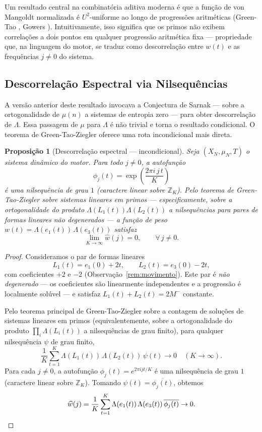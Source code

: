 \documentclass[12pt,a4paper]{article}
\newtheorem{proposition}[theorem]{Proposição}
\theoremstyle{definition}
\newcommand{\Z}{\mathbb{Z}}
\begin{document}
	Um resultado central na combinatória aditiva moderna é que a função de
	von Mangoldt normalizada é $U^2$-uniforme ao longo de progressões
	aritméticas (Green-Tao \cite{greentao}, Gowers \cite{gowers}).
	Intuitivamente, isso significa que os primos não exibem correlações a
	dois pontos em qualquer progressão aritmética fixa — propriedade que,
	na linguagem do motor, se traduz como descorrelação entre $w(t)$ e as
	frequências $j \neq 0$ do sistema.
	
	\subsection{Descorrelação Espectral via Nilsequências}
	
	A versão anterior deste resultado invocava a Conjectura de Sarnak
	\cite{sarnak} — sobre a ortogonalidade de $\mu(n)$ a sistemas de
	entropia zero — para obter descorrelação de $\Lambda$. Essa passagem
	de $\mu$ para $\Lambda$ é não trivial e torna o resultado condicional.
	O teorema de Green-Tao-Ziegler \cite{greentaoziegler} oferece uma rota
	incondicional mais direta.
	
	\begin{proposition}[Descorrelação espectral — incondicional]
		\label{prop:sarnak}
		Seja $(X_N, \mu_N, T)$ o sistema dinâmico do motor. Para todo
		$j \neq 0$, a autofunção
		\[
		\phi_j(t) = \exp\!\left(\frac{2\pi i\,j\,t}{K}\right)
		\]
		é uma nilsequência de grau $1$ (caractere linear sobre $\Z_K$).
		Pelo teorema de Green-Tao-Ziegler \cite{greentaoziegler} sobre
		sistemas lineares em primos — especificamente, sobre a
		ortogonalidade do produto $\Lambda(L_1(t))\Lambda(L_2(t))$ a
		nilsequências para pares de formas lineares não degenerados —
		a função de peso $w(t) = \Lambda(e_1(t))\,\Lambda(e_3(t))$ satisfaz
		\[
		\lim_{K\to\infty}\widehat{w}(j) = 0,\qquad \forall\, j \neq 0.
		\]
	\end{proposition}
	
	\begin{proof}
		Consideramos o par de formas lineares
		\[
		L_1(t) = e_1(0) + 2t,\qquad L_2(t) = e_3(0) - 2t,
		\]
		com coeficientes $+2$ e $-2$ (Observação~\ref{rem:movimento}).
		Este par é \emph{não degenerado} — os coeficientes são linearmente
		independentes e a progressão é localmente solúvel — e satisfaz
		$L_1(t) + L_2(t) = 2M^-$ constante.
		
		Pelo teorema principal de Green-Tao-Ziegler
		\cite{greentaoziegler} sobre a contagem de soluções de sistemas
		lineares em primos (equivalentemente, sobre a ortogonalidade do
		produto $\prod_i \Lambda(L_i(t))$ a nilsequências de grau finito),
		para qualquer nilsequência $\psi$ de grau finito,
		\[
		\frac{1}{K}\sum_{t=1}^{K} \Lambda(L_1(t))\,\Lambda(L_2(t))\,\psi(t) \to 0
		\quad (K \to \infty).
		\]
		Para cada $j \neq 0$, a autofunção $\phi_j(t) = e^{2\pi i j t/K}$ é
		uma nilsequência de grau $1$ (caractere linear sobre $\Z_K$).
		Tomando $\psi(t) = \overline{\phi_j(t)}$, obtemos
		\[
		\widehat{w}(j)
		= \frac{1}{K}\sum_{t=1}^{K} \Lambda(e_1(t))\,\Lambda(e_3(t))\,
		\overline{\phi_j(t)} \to 0. \qedhere
		\]
	\end{proof}
	
\end{document}
